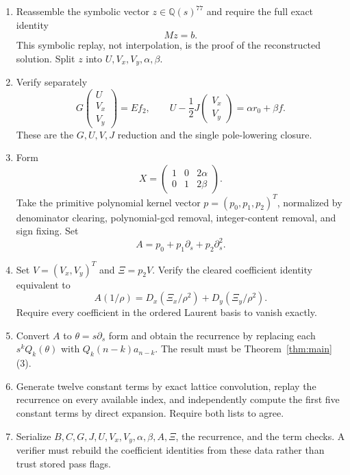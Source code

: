 \documentclass[11pt,fleqn]{article}
\theoremstyle{plain}
\newcommand{\Dx}{D_x}
\newcommand{\Dy}{D_y}
\begin{document}
\begin{enumerate}[label=\texttt{\arabic*.},leftmargin=2.7em,itemsep=0.25em,topsep=0pt]
\item Reassemble the symbolic vector \(z\in\mathbb Q(s)^{77}\) and require the
full exact identity
\[
 Mz=b.
\]
This symbolic replay, not interpolation, is the proof of the reconstructed
solution.  Split \(z\) into \(U,V_x,V_y,\alpha,\beta\).

\item Verify separately
\[
 G\begin{pmatrix}U\\V_x\\V_y\end{pmatrix}=Ef_2,
 \qquad
 U-\frac12J\begin{pmatrix}V_x\\V_y\end{pmatrix}
   =\alpha r_0+\beta f.
\]
These are the \(G,U,V,J\) reduction and the single pole-lowering closure.

\item Form
\[
 X=\begin{pmatrix}1&0&2\alpha\\0&1&2\beta\end{pmatrix}.
\]
Take the primitive polynomial kernel vector
\(p=(p_0,p_1,p_2)^T\), normalized by denominator clearing, polynomial-gcd
removal, integer-content removal, and sign fixing.  Set
\[
 A=p_0+p_1\partial_s+p_2\partial_s^2.
\]

\item Set \(V=(V_x,V_y)^T\) and \(\Xi=p_2V\).  Verify the cleared coefficient
identity equivalent to
\[
 A(1/\rho)
 =\Dx(\Xi_x/\rho^2)+\Dy(\Xi_y/\rho^2).
\]
Require every coefficient in the ordered Laurent basis to vanish exactly.

\item Convert \(A\) to \(\theta=s\partial_s\) form and obtain the recurrence by
replacing each \(s^kQ_k(\theta)\) with
\(Q_k(n-k)a_{n-k}\).  The result must be Theorem~\ref{thm:main}(3).

\item Generate twelve constant terms by exact lattice convolution, replay the
recurrence on every available index, and independently compute the first five
constant terms by direct expansion.  Require both lists to agree.

\item Serialize \(B,C,G,J,U,V_x,V_y,\alpha,\beta,A,\Xi\), the recurrence,
and the term checks.  A verifier must rebuild the coefficient identities from
these data rather than trust stored pass flags.
\end{enumerate}
\endgroup
\end{document}
